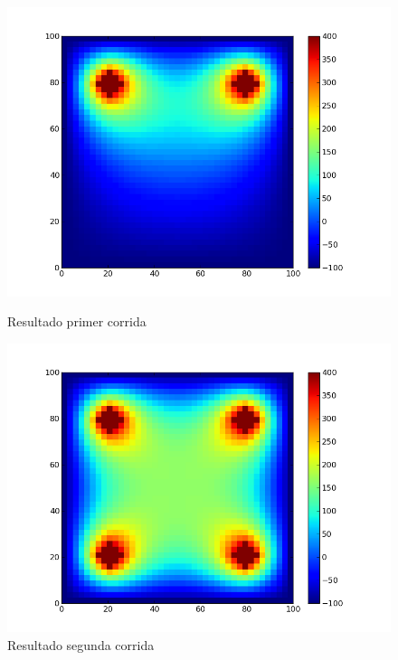 \begin{figure}[htb]

\begin{center}
\includegraphics[scale=0.3]{imagenes/random_1.png} 
\caption{Resultado primer corrida} 
        \end{center}
\endminipage\hfill
{}
\begin{center}
\includegraphics[scale=0.3]{imagenes/random_2.png} 
\caption{Resultado segunda corrida} 
        \end{center}
\endminipage\hfill 
\end{figure}

